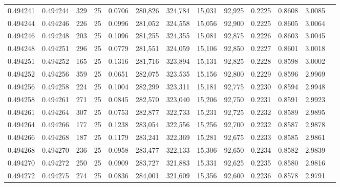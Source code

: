 \begin{tabular}{rrrrrrrrrrrrr}
0.494241 & 0.494244 &   329 &  25 &                                     0.0706 & 280,826 & 324,784 &  15,031 &  92,925 & 0.2225 & 0.8608 & 3.0085 \\
0.494244 & 0.494246 &   226 &  25 &                                     0.0996 & 281,052 & 324,558 &  15,056 &  92,900 & 0.2225 & 0.8605 & 3.0064 \\
0.494246 & 0.494248 &   203 &  25 &                                     0.1096 & 281,255 & 324,355 &  15,081 &  92,875 & 0.2226 & 0.8603 & 3.0045 \\
0.494248 & 0.494251 &   296 &  25 &                                     0.0779 & 281,551 & 324,059 &  15,106 &  92,850 & 0.2227 & 0.8601 & 3.0018 \\
0.494251 & 0.494252 &   165 &  25 &                                     0.1316 & 281,716 & 323,894 &  15,131 &  92,825 & 0.2228 & 0.8598 & 3.0002 \\
0.494252 & 0.494256 &   359 &  25 &                                     0.0651 & 282,075 & 323,535 &  15,156 &  92,800 & 0.2229 & 0.8596 & 2.9969 \\
0.494256 & 0.494258 &   224 &  25 &                                     0.1004 & 282,299 & 323,311 &  15,181 &  92,775 & 0.2230 & 0.8594 & 2.9948 \\
0.494258 & 0.494261 &   271 &  25 &                                     0.0845 & 282,570 & 323,040 &  15,206 &  92,750 & 0.2231 & 0.8591 & 2.9923 \\
0.494261 & 0.494264 &   307 &  25 &                                     0.0753 & 282,877 & 322,733 &  15,231 &  92,725 & 0.2232 & 0.8589 & 2.9895 \\
0.494264 & 0.494266 &   177 &  25 &                                     0.1238 & 283,054 & 322,556 &  15,256 &  92,700 & 0.2232 & 0.8587 & 2.9878 \\
0.494266 & 0.494268 &   187 &  25 &                                     0.1179 & 283,241 & 322,369 &  15,281 &  92,675 & 0.2233 & 0.8585 & 2.9861 \\
0.494268 & 0.494270 &   236 &  25 &                                     0.0958 & 283,477 & 322,133 &  15,306 &  92,650 & 0.2234 & 0.8582 & 2.9839 \\
0.494270 & 0.494272 &   250 &  25 &                                     0.0909 & 283,727 & 321,883 &  15,331 &  92,625 & 0.2235 & 0.8580 & 2.9816 \\
0.494272 & 0.494275 &   274 &  25 &                                     0.0836 & 284,001 & 321,609 &  15,356 &  92,600 & 0.2236 & 0.8578 & 2.9791 \\

\end{tabular}
